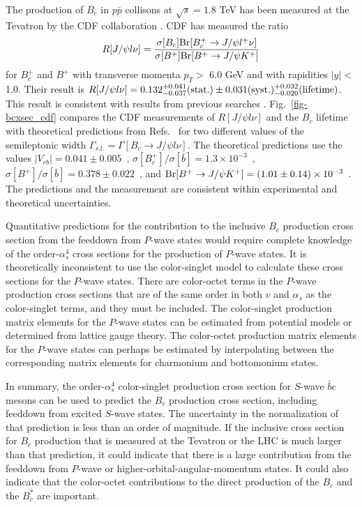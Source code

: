 The production of $B_c$ in $p \bar p$ collisons at $\sqrt{s} = 1.8$ TeV 
has been measured at the Tevatron by the CDF collaboration 
\cite{Abe:1998wi,Abe:1998fb}. 
CDF has measured the ratio
%
\begin{eqnarray}
R[J/\psi l\nu] = 
{\sigma[B_c] {\rm Br}[B_c^+ \rightarrow J/\psi l^+\nu]
\over \sigma[B^+] {\rm Br}[B^+ \rightarrow J/\psi K^+]}
\label{prodsec:Bcratio}
\end{eqnarray}
%
for $B_c^+$ and $B^+$ with transverse momenta $p_T >$ 6.0 GeV 
and with rapidities $|y| <$ 1.0. 
Their result is $R[J/\psi l\nu] = 0.132^{+0.041}_{-0.037}(\rm stat.)
\pm 0.031 (\rm syst.) ^{+0.032}_{-0.020}(\rm lifetime)$. 
This result is consistent with results from previous 
searches \cite{Abreu:1996nz,Barate:1997kk,Ackerstaff:1998zf}. 
Fig.~\ref{fig-bcxsec_cdf} compares the CDF
measurements of $R[J/\psi l\nu]$ and the $B_c$ lifetime
with theoretical predictions from Refs.~\cite{Lusignoli1,Scora}
for two different values of the semileptonic width 
$\Gamma_{s.l.} = \Gamma[B_c \rightarrow J/\psi l \nu]$. 
The theoretical predictions use the values 
$|V_{cb}| = 0.041 \pm 0.005$~\cite{PDG96}, 
$\sigma[B^+_c]/\sigma[\bar{b}] = 1.3 \times 10^{-3}$~\cite{Lusignoli2}, 
$\sigma[B^+]/\sigma[\bar{b}] = 0.378 \pm 0.022$~\cite{PDG96}, 
and ${\rm Br}[B^+ \rightarrow J/\psi K^+] 
        = (1.01 \pm 0.14) \times 10^{-3}$~\cite{PDG96}.
The predictions and the measurement are consistent within 
experimental and theoretical uncertainties.  



Quantitative predictions for the contribution to the inclusive $B_c$
production cross section from the feeddown from $P$-wave states would
require complete knowledge of the order-$\alpha_s^4$ cross sections for
the production of $P$-wave states. It is theoretically inconsistent to
use the color-singlet model to calculate these cross sections for the
$P$-wave states. There are color-octet terms in the $P$-wave production
cross sections that are of the same order in both $v$ and $\alpha_s$ as
the color-singlet terms, and they must be included. The color-singlet
production matrix elements for the $P$-wave states can be estimated from
potential models or determined from lattice gauge theory.  The
color-octet production matrix elements for the $P$-wave states can
perhaps be estimated by interpolating between the corresponding matrix
elements for charmonium and bottomonium states.

In summary, the order-$\alpha_s^4$ color-singlet production cross
section for $S$-wave $\bar b c$ mesons can be used to predict the $B_c$
production cross section, including feeddown from excited $S$-wave
states.  The uncertainty in the normalization of that prediction is less
than an order of magnitude. If the inclusive cross section for $B_c$
production that is measured at the Tevatron or the LHC is much larger
than that prediction, it could indicate that there is a large
contribution from the feeddown from $P$-wave or
higher-orbital-angular-momentum states. It could also indicate that the
color-octet contributions to the direct production of the $B_c$ and the
$B_c^*$ are important. 



